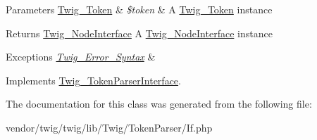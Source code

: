 \begin{DoxyParams}[1]{Parameters}
\hyperlink{classTwig__Token}{Twig\+\_\+\+Token} & {\em \$token} & A \hyperlink{classTwig__Token}{Twig\+\_\+\+Token} instance\\
\hline
\end{DoxyParams}
\begin{DoxyReturn}{Returns}
\hyperlink{interfaceTwig__NodeInterface}{Twig\+\_\+\+Node\+Interface} A \hyperlink{interfaceTwig__NodeInterface}{Twig\+\_\+\+Node\+Interface} instance
\end{DoxyReturn}

\begin{DoxyExceptions}{Exceptions}
{\em \hyperlink{classTwig__Error__Syntax}{Twig\+\_\+\+Error\+\_\+\+Syntax}} & \\
\hline
\end{DoxyExceptions}


Implements \hyperlink{interfaceTwig__TokenParserInterface_a9d003ebcca4a13c6f36b86e79815e823}{Twig\+\_\+\+Token\+Parser\+Interface}.



The documentation for this class was generated from the following file\+:\begin{DoxyCompactItemize}
\item 
vendor/twig/twig/lib/\+Twig/\+Token\+Parser/If.\+php\end{DoxyCompactItemize}
